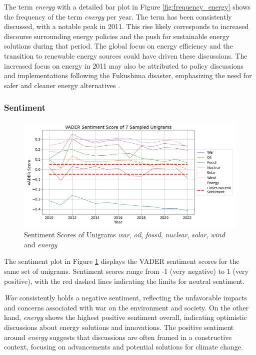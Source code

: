 The term \emph{energy} with a detailed bar plot in Figure \ref{fig:frequency_energy} shows the frequency of the term \emph{energy} per year. The term has been consistently discussed, with a notable peak in 2011. This rise likely corresponds to increased discourse surrounding energy policies and the push for sustainable energy solutions during that period. The global focus on energy efficiency and the transition to renewable energy sources could have driven these discussions. The increased focus on energy in 2011 may also be attributed to policy discussions and implementations following the Fukushima disaster, emphasizing the need for safer and cleaner energy alternatives \cite{iea2011policies}.

\subsubsection{Sentiment}
\begin{figure}[h]
    \includegraphics[width=\textwidth]{images/topic_details/ngram/sentiment_per_topic_7Unigram.png}
    \caption{Sentiment Scores of Unigrams \emph{war}, \emph{oil}, \emph{fossil}, \emph{nuclear}, \emph{solar}, \emph{wind} and \emph{energy}}
    \label{fig:sentiment_unigrams}
\end{figure}
The sentiment plot in Figure \ref{fig:sentiment_unigrams} displays the VADER sentiment scores for the same set of unigrams. Sentiment scores range from -1 (very negative) to 1 (very positive), with the red dashed lines indicating the limits for neutral sentiment.

\emph{War} consistently holds a negative sentiment, reflecting the unfavorable impacts and concerns associated with war on the environment and society. On the other hand, \emph{energy} shows the highest positive sentiment overall, indicating optimistic discussions about energy solutions and innovations. The positive sentiment around \emph{energy} suggests that discussions are often framed in a constructive context, focusing on advancements and potential solutions for climate change.


